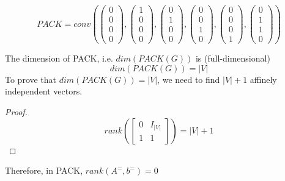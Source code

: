                 \begin{equation*}
                    PACK = conv\left(
                        \left(\begin{matrix}0 \\ 0 \\ 0 \\ 0\end{matrix}\right),
                        \left(\begin{matrix}1 \\ 0 \\ 0 \\ 0\end{matrix}\right),
                        \left(\begin{matrix}0 \\ 1 \\ 0 \\ 0\end{matrix}\right),
                        \left(\begin{matrix}0 \\ 0 \\ 1 \\ 0\end{matrix}\right),
                        \left(\begin{matrix}0 \\ 0 \\ 0 \\ 1\end{matrix}\right),
                        \left(\begin{matrix}0 \\ 1 \\ 1 \\ 0\end{matrix}\right)
                        \right)\nonumber
                \end{equation*}

                The dimension of PACK, i.e. $dim(PACK(G))$ is (full-dimensional)
                \begin{equation*}
                    dim(PACK(G)) = |V| \nonumber
                \end{equation*}
                To prove that $dim(PACK(G)) = |V|$, we need to find $|V| + 1$ affinely independent vectors.\\
                \begin{proof}
                    \begin{equation*}
                        rank\left(\left[\begin{matrix}0 & I_{|V|} \\ 1 & 1\end{matrix}\right]\right) = |V| + 1 \nonumber
                    \end{equation*}
                \end{proof}                    
                Therefore, in PACK, $rank(A^=,b^=)=0$ 


